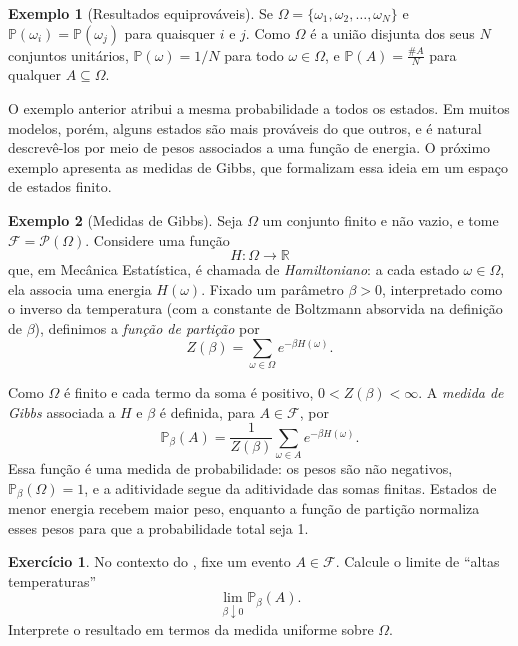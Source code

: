 \documentclass[12pt,portuguese]{article}
\theoremstyle{definition}
\newtheorem{example}[example]{Exemplo}
\newtheorem{exercise}{Exercício}
\begin{document}
\begin{example}[Resultados equiprováveis]\label{ex:1.23}
Se \(\Omega = \{\omega_1, \omega_2, \ldots, \omega_N\}\) e
\(\mathbb{P}(\omega_i) = \mathbb{P}(\omega_j)\) para quaisquer \(i\) e
\(j\). Como \(\Omega\) é a união disjunta dos seus \(N\) conjuntos
unitários, \(\mathbb{P}(\omega) = 1/N\) para todo \(\omega \in \Omega\),
e \(\mathbb{P}(A) = \frac{\# A}{N}\) para qualquer \(A \subseteq \Omega\).
\end{example}

O exemplo anterior atribui a mesma probabilidade a todos os estados. Em
muitos modelos, porém, alguns estados são mais prováveis do que outros, e é
natural descrevê-los por meio de pesos associados a uma função de energia.
O próximo exemplo apresenta as medidas de Gibbs, que formalizam essa ideia em
um espaço de estados finito.

\begin{example}[Medidas de Gibbs]\label{ex:gibbs-measure}
  Seja \(\Omega\) um conjunto finito e não vazio, e tome
  \(\mathcal{F} = \mathscr{P}(\Omega)\). Considere uma função
  \[
    H : \Omega \longrightarrow \mathbb{R}
  \]
  que, em Mecânica Estatística, é chamada de \emph{Hamiltoniano}: a cada
  estado \(\omega \in \Omega\), ela associa uma energia \(H(\omega)\).
  Fixado um parâmetro \(\beta > 0\), interpretado como o inverso da
  temperatura (com a constante de Boltzmann absorvida na definição de
  \(\beta\)), definimos a \emph{função de partição} por
  \[
    Z(\beta) = \sum_{\omega \in \Omega} e^{-\beta H(\omega)}.
  \]

  Como \(\Omega\) é finito e cada termo da soma é positivo,
  \(0 < Z(\beta) < \infty\). A \emph{medida de Gibbs} associada a \(H\) e
  \(\beta\) é definida, para \(A \in \mathcal{F}\), por
  \[
    \mathbb{P}_\beta(A)
    = \frac{1}{Z(\beta)}
      \sum_{\omega \in A} e^{-\beta H(\omega)}.
  \]
  Essa função é uma medida de probabilidade: os pesos são não negativos,
  \(\mathbb{P}_\beta(\Omega)=1\), e a aditividade segue da aditividade das
  somas finitas. Estados de menor energia recebem maior peso, enquanto a
  função de partição normaliza esses pesos para que a probabilidade total
  seja 1.
\end{example}

\begin{exercise}\label{exercise:gibbs-high-temperature}
  No contexto do , fixe um evento \(A \in \mathcal{F}\).
  Calcule o limite de ``altas temperaturas''
  \[
    \lim_{\beta \downarrow 0} \mathbb{P}_\beta(A).
  \]
  Interprete o resultado em termos da medida uniforme sobre \(\Omega\).
\end{exercise}
\end{document}
